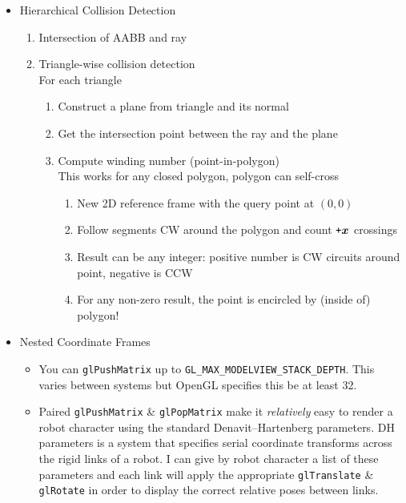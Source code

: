 \documentclass{hw_grad}
\begin{document}
\begin{enumerate}
\begin{itemize}
			\item Hierarchical Collision Detection
			\begin{enumerate}
				\item Intersection of AABB and ray
				\item Triangle-wise collision detection \\
				For each triangle
				\begin{enumerate}
					\item Construct a plane from triangle and its normal
					\item Get the intersection point between the ray and the plane
					\item Compute winding number (point-in-polygon) \\
					This works for any closed polygon, polygon can self-cross
					\begin{enumerate}
						\item New 2D reference frame with the query point at $\left( 0 , 0 \right)$ 
						\item Follow segments CW around the polygon and count $ \texttt{+} \hbox{\boldmath$x$} $ crossings
						\item Result can be any integer: positive number is CW circuits around point, negative is CCW 
						\item For any non-zero result, the point is encircled by (inside of) polygon!
					\end{enumerate}
				\end{enumerate}
			\end{enumerate}
			
			\item Nested Coordinate Frames
			\begin{itemize}
				\item You can {\tt glPushMatrix} up to {\tt GL\_MAX\_MODELVIEW\_STACK\_DEPTH}.  This varies between systems but OpenGL specifies this be at least 32.
				\item Paired {\tt glPushMatrix} \& {\tt glPopMatrix} make it \textit{relatively} easy to render a robot character using the standard Denavit–Hartenberg parameters.  DH parameters is a system that specifies serial coordinate transforms across the rigid links of a robot.  I can give by robot character a list of these parameters and each link will apply the appropriate {\tt glTranslate} \& {\tt glRotate} in order to display the correct relative poses between links.
			\end{itemize}
			
		\end{itemize}
		

\end{enumerate}
\end{document}
